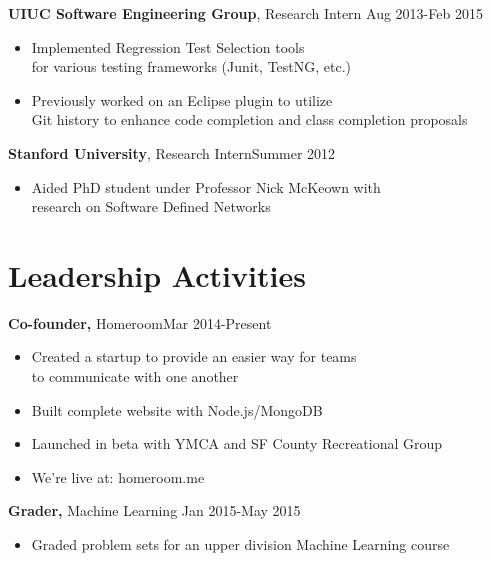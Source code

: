 \documentclass[margin]{res}
\begin{document}
\begin{resume}
                  \parskip 2pt                  
                  {\bf UIUC Software Engineering Group}, Research Intern \hfill Aug 2013-Feb 2015
                  \begin{itemize} \itemsep -3pt  %
                  \item Implemented Regression Test Selection tools \\for various testing frameworks (Junit, TestNG, etc.)
                  \item Previously worked on an Eclipse plugin to utilize \\Git history to enhance code completion and class completion proposals
                  \end{itemize}
                  
                  {\bf Stanford University}, Research Intern\hfill  Summer 2012
                  \begin{itemize} \itemsep -3pt %
                  \item Aided PhD student under Professor Nick McKeown with\\ research on Software Defined Networks 
                  \end{itemize}


                  \section{Leadership   Activities} 
                          {\bf Co-founder,} Homeroom\hfill Mar 2014-Present \parskip -2pt
                          \begin{itemize} \itemsep -3pt
                          \item Created a startup to provide an easier way for teams\\ to communicate with one another
                          \item Built complete website with Node.js/MongoDB
                          \item Launched in beta with YMCA and SF County
                              Recreational Group
                          \item We're live at: homeroom.me \smallskip
		          \end{itemize}
                          
	                  {\bf Grader, } Machine Learning \hfill Jan 2015-May 2015
                          \begin{itemize} \itemsep -3pt
                          \item
                            Graded problem sets for an upper division Machine Learning course \smallskip
                          \end{itemize}
                          

\end{resume}
\end{document}
